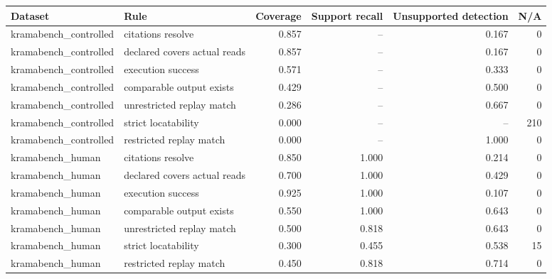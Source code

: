 \begin{tabular}{llrrrr}
\toprule
Dataset & Rule & Coverage & Support recall & Unsupported detection & N/A \\
\midrule
kramabench_controlled & citations resolve & 0.857 & -- & 0.167 & 0 \\
kramabench_controlled & declared covers actual reads & 0.857 & -- & 0.167 & 0 \\
kramabench_controlled & execution success & 0.571 & -- & 0.333 & 0 \\
kramabench_controlled & comparable output exists & 0.429 & -- & 0.500 & 0 \\
kramabench_controlled & unrestricted replay match & 0.286 & -- & 0.667 & 0 \\
kramabench_controlled & strict locatability & 0.000 & -- & -- & 210 \\
kramabench_controlled & restricted replay match & 0.000 & -- & 1.000 & 0 \\
kramabench_human & citations resolve & 0.850 & 1.000 & 0.214 & 0 \\
kramabench_human & declared covers actual reads & 0.700 & 1.000 & 0.429 & 0 \\
kramabench_human & execution success & 0.925 & 1.000 & 0.107 & 0 \\
kramabench_human & comparable output exists & 0.550 & 1.000 & 0.643 & 0 \\
kramabench_human & unrestricted replay match & 0.500 & 0.818 & 0.643 & 0 \\
kramabench_human & strict locatability & 0.300 & 0.455 & 0.538 & 15 \\
kramabench_human & restricted replay match & 0.450 & 0.818 & 0.714 & 0 \\
\bottomrule
\end{tabular}
